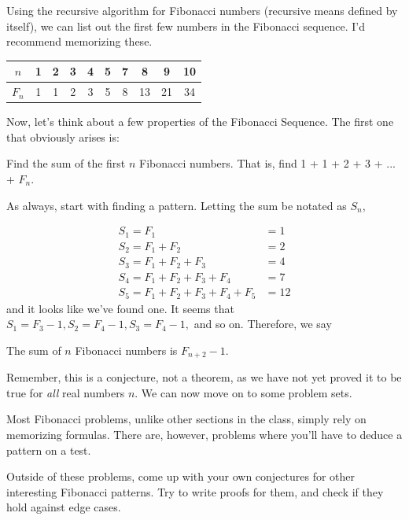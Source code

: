 \documentclass[11pt]{article}
\begin{document}
Using the recursive algorithm for Fibonacci numbers (recursive means defined by itself), we can list out the first few numbers in the Fibonacci sequence. I'd recommend memorizing these.

\begin{center}
\begin{tabular}{c|c|c|c|c|c|c|c|c|c}
	$n$ & 1 & 2 & 3 &4 & 5 & 7 & 8 & 9 & 10 \\
	\hline
	$F_n$ & 1 & 1 & 2 & 3 & 5 & 8 & 13 & 21 & 34
\end{tabular}
\end{center}
Now, let's think about a few properties of the Fibonacci Sequence. The first one that obviously arises is:

\begin{example}
	Find the sum of the first $n$ Fibonacci numbers. That is, find 1 + 1 + 2 + 3 + ... + $F_n$.
\end{example}
As always, start with finding a pattern. Letting the sum be notated as $S_n$,

\begin{align*}
	S_1 = F_1 &= 1 \\
	S_2 = F_1 + F_2 &= 2 \\
	S_3 = F_1 + F_2 + F_3 &= 4 \\
	S_4 = F_1 + F_2 + F_3 + F_4 &= 7 \\
	S_5 = F_1 + F_2 + F_3 + F_4 + F_5 &= 12
\end{align*}
and it looks like we've found one. It seems that $S_1 = F_3 - 1, S_2 = F_4 - 1, S_3 = F_4 - 1,$ and so on. Therefore, we say

\begin{prop}
	The sum of $n$ Fibonacci numbers is $F_{n+2} - 1$.
\end{prop}

Remember, this is a conjecture, not a theorem, as we have not yet proved it to be true for \textit{all} real numbers $n$. We can now move on to some problem sets.

Most Fibonacci problems, unlike other sections in the class, simply rely on memorizing formulas. There are, however, problems where you'll have to deduce a pattern on a test.

Outside of these problems, come up with your own conjectures for other interesting Fibonacci patterns. Try to write proofs for them, and check if they hold against edge cases.

\newpage
\end{document}
